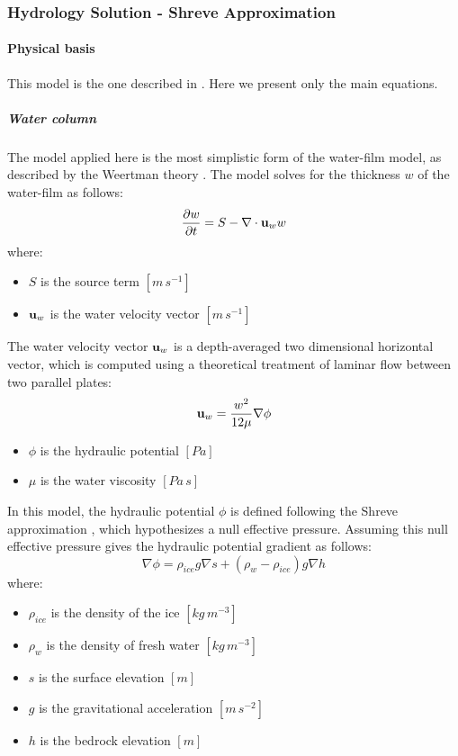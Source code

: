 
\subsubsection{Hydrology Solution - Shreve Approximation} \label{sec:using-issm-capabilities-hydrology-shreve}

\paragraph{Physical basis}
This model is the one described in \cite{LeBrocq2009}. Here we present only the main equations.

\subparagraph{Water column}
The model applied here is the most simplistic form of the water-film model, as described by the Weertman theory \citep{Weertman1957}. The model solves for the thickness $w$ of the water-film as follows:
\begin{equation}
	\frac{\partial w}{\partial t}=S - \nabla \cdot {\bf u}_{w} w
\end{equation}
where:
\begin{itemize}
	\item $S$ is the source term $[m\,s^{-1}]$
	\item ${\bf u}_w$ is the water velocity vector $[m\,s^{-1}]$
\end{itemize}

The water velocity vector ${\bf u}_w$ is a depth-averaged two dimensional horizontal vector, which is computed using a theoretical treatment of laminar flow between two parallel plates:
\begin{equation}
	{\bf u}_w = \frac{w^2}{12 \mu}\nabla \phi
\end{equation}
\begin{itemize}
	\item $\phi$ is the hydraulic potential $[Pa]$
	\item $\mu$ is the water viscosity $[Pa\,s]$
\end{itemize}

In this model, the hydraulic potential $\phi$ is defined following the Shreve approximation \citep{Shreve1972}, which hypothesizes a null effective pressure. Assuming this null effective pressure gives the hydraulic potential gradient as follows:
\begin{equation}
	\nabla \phi=\rho_{ice} g \nabla s + \left(\rho_w - \rho_{ice}\right) g \nabla h 
\end{equation}
where:
\begin{itemize}
	\item $\rho_{ice}$ is the density of the ice $[kg\,m^{-3}]$
	\item $\rho_w$ is the density of fresh water $[kg\,m^{-3}]$
	\item $s$ is the surface elevation $[m]$
	\item $g$ is the gravitational acceleration $[m\,s^{-2}]$
	\item $h$ is the bedrock elevation $[m]$
\end{itemize}

